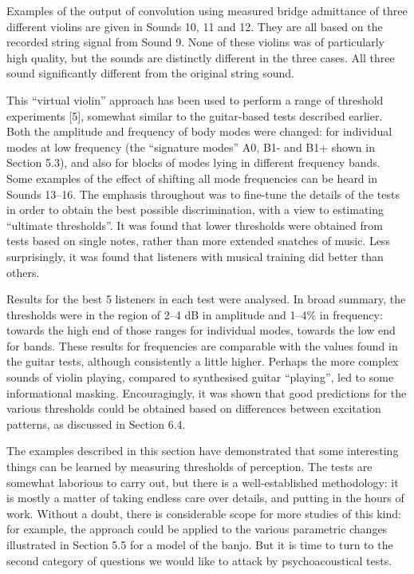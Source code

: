   Examples of the output of convolution using measured bridge admittance of 
  three different violins are given in Sounds 10, 11 and 12. They are all based 
  on the recorded string signal from Sound 9. None of these violins was of 
  particularly high quality, but the sounds are distinctly different in the 
  three cases. All three sound significantly different from the original string 
  sound. 

\audio{}

\audio{}

\audio{}

  This “virtual violin” approach has been used to perform a range of threshold 
  experiments [5], somewhat similar to the guitar-based tests described 
  earlier. Both the amplitude and frequency of body modes were changed: for 
  individual modes at low frequency (the “signature modes” A0, B1- and B1+ 
  shown in Section 5.3), and also for blocks of modes lying in different 
  frequency bands. Some examples of the effect of shifting all mode frequencies 
  can be heard in Sounds 13--16. The emphasis throughout was to fine-tune the 
  details of the tests in order to obtain the best possible discrimination, 
  with a view to estimating “ultimate thresholds”. It was found that lower 
  thresholds were obtained from tests based on single notes, rather than more 
  extended snatches of music. Less surprisingly, it was found that listeners 
  with musical training did better than others. 

\audio{}

\audio{}

\audio{}

\audio{}

  Results for the best 5 listeners in each test were analysed. In broad 
  summary, the thresholds were in the region of 2--4 dB in amplitude and 1--4\% 
  in frequency: towards the high end of those ranges for individual modes, 
  towards the low end for bands. These results for frequencies are comparable 
  with the values found in the guitar tests, although consistently a little 
  higher. Perhaps the more complex sounds of violin playing, compared to 
  synthesised guitar ``playing'', led to some informational masking. 
  Encouragingly, it was shown that good predictions for the various thresholds 
  could be obtained based on differences between excitation patterns, as 
  discussed in Section 6.4. 

  The examples described in this section have demonstrated that some 
  interesting things can be learned by measuring thresholds of perception. The 
  tests are somewhat laborious to carry out, but there is a well-established 
  methodology: it is mostly a matter of taking endless care over details, and 
  putting in the hours of work. Without a doubt, there is considerable scope 
  for more studies of this kind: for example, the approach could be applied to 
  the various parametric changes illustrated in Section 5.5 for a model of the 
  banjo. But it is time to turn to the second category of questions we would 
  like to attack by psychoacoustical tests. 



